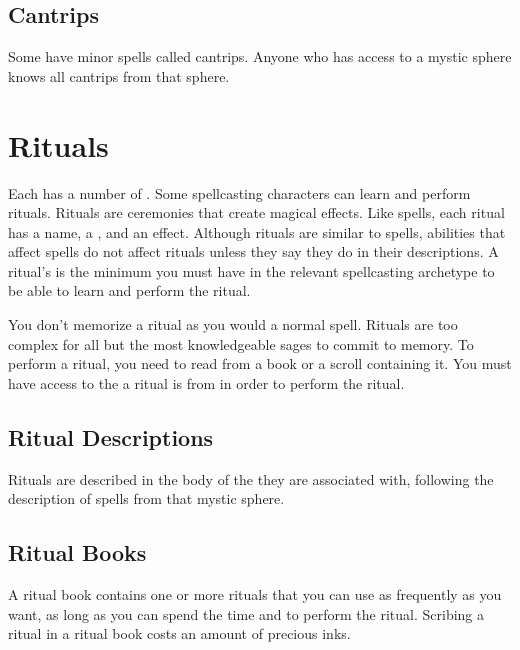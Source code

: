     \subsection{Cantrips}\label{Cantrips}
        Some  have minor spells called cantrips.
        Anyone who has access to a mystic sphere knows all cantrips from that sphere.

\section{Rituals}\label{Rituals}
    Each  has a number of .
    Some spellcasting characters can learn and perform rituals.
    Rituals are ceremonies that create magical effects.
    Like spells, each ritual has a name, a , and an effect.
    Although rituals are similar to spells, abilities that affect spells do not affect rituals unless they say they do in their descriptions.
    A ritual's  is the minimum  you must have in the relevant spellcasting archetype to be able to learn and perform the ritual.

    You don't memorize a ritual as you would a normal spell.
    Rituals are too complex for all but the most knowledgeable sages to commit to memory.
    To perform a ritual, you need to read from a book or a scroll containing it.
    You must have access to the  a ritual is from in order to perform the ritual.

    \subsection{Ritual Descriptions}
        Rituals are described in the body of the  they are associated with, following the description of spells from that mystic sphere.

    \subsection{Ritual Books}
        A ritual book contains one or more rituals that you can use as frequently as you want, as long as you can spend the time and  to perform the ritual.
        Scribing a ritual in a ritual book costs an amount of precious inks.

